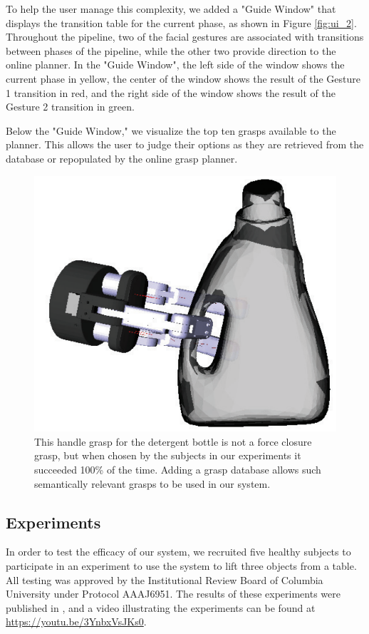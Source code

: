 To help the user manage this complexity, we added a "Guide Window" that displays the transition table for the current phase, as shown in Figure \ref{fig:ui_2}. Throughout the pipeline, two of the facial gestures are associated with transitions between phases of the pipeline, while the other two provide direction to the online planner. In the "Guide Window", the left side of the window shows the current phase in yellow, the center of the window shows the result of the Gesture 1 transition in red, and the right side of the window shows the result of the Gesture 2 transition in green. 

Below the "Guide Window," we visualize the top ten grasps available to the planner. This allows the user to judge their options as they are retrieved from the database or repopulated by the online grasp planner. 


\begin{figure}
\centering
\includegraphics[height=.2\textheight]{manual_grasp_1.png}
\caption{This handle grasp for the detergent bottle is not a force closure grasp, but when chosen by the subjects in our experiments it succeeded 100\% of the time. Adding a grasp database allows such semantically relevant grasps to be used in our system.}
\label{fig:manual_grasp_1}
\end{figure}


\subsection{Experiments}
In order to test the efficacy of our system, we recruited five healthy subjects to participate in an experiment to use the system to lift three objects from a table.  All testing was approved by the Institutional Review Board of Columbia University under Protocol AAAJ6951. The results of these experiments were published in \cite{Weisz2013}, and a video illustrating the experiments can be found at \url{https://youtu.be/3YnbxVsJKs0}.

